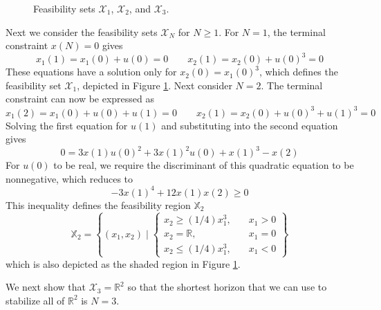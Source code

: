 \documentclass{article}
\newcommand{\bbR}{\mathbb{R}}
\newcommand{\bbX}{\mathbb{X}}
\begin{document}
\begin{figure}
\centering
\resizebox{0.9\textwidth}{!}{}
\caption{Feasibility sets $\mathcal{X}_1$, $\mathcal{X}_2$, and
  $\mathcal{X}_3$.}
\label{fig:feasibility_set}
\end{figure} 

Next we consider the feasibility sets $\mathcal{X}_N$ for $N \geq 1$. For
$N=1$, the terminal constraint $x(N)=0$ gives
\begin{equation*}
x_1(1) = x_1(0) + u(0) = 0 \qquad
x_2(1) = x_2(0) + u(0)^3 = 0
\end{equation*}
These equations have a solution only for $x_2(0)= x_1(0)^3$, which
defines the feasibility set $\mathcal{X}_1$, depicted in Figure
\ref{fig:feasibility_set}. Next consider $N=2$.  The terminal
constraint can now be expressed as
\begin{equation*}
x_1(2) = x_1(0) + u(0) + u(1)= 0 \qquad
x_2(1) = x_2(0) + u(0)^3 + u(1)^3 = 0
\end{equation*}
Solving the first equation for $u(1)$ and substituting into the second
equation gives
\begin{equation*}
0 = 3x(1)u(0)^2 + 3 x(1)^2 u(0) + x(1)^3 - x(2)
\end{equation*}
For $u(0)$ to be real, we require the discriminant of this quadratic
equation to be nonnegative, which reduces to
\begin{equation*}
-3x(1)^4 + 12 x(1)x(2) \geq 0
\end{equation*}
This inequality defines the feasibility region $\bbX_2$
\begin{equation*}
\bbX_2 = \left\{ (x_1, x_2) \mid 
\begin{cases}
x_2 \geq (1/4)x_1^3, \quad &x_1 > 0 \\
x_2 = \bbR, \quad &x_1 = 0 \\
x_2 \leq (1/4)x_1^3, \quad &x_1 < 0
\end{cases} \right\}
\end{equation*}
which is also depicted as the shaded region in Figure \ref{fig:feasibility_set}.

We next show that $\mathcal{X}_3 = \bbR^2$ so that the shortest
horizon that we can use to stabilize all of $\bbR^2$ is $N=3$. 
\end{document}
